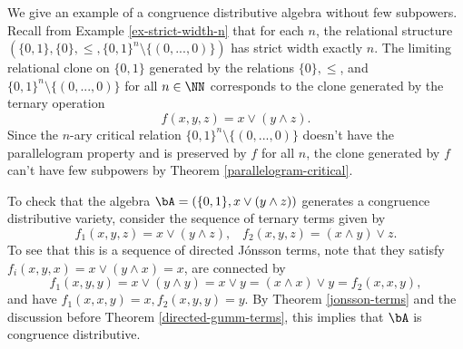 \begin{ex} We give an example of a congruence distributive algebra without few subpowers. Recall from Example \ref{ex-strict-width-n} that for each $n$, the relational structure $(\{0,1\}, \{0\}, \le, \{0,1\}^n\setminus\{(0,...,0)\})$ has strict width exactly $n$. The limiting relational clone on $\{0,1\}$ generated by the relations $\{0\}, \le$, and $\{0,1\}^n\setminus\{(0,...,0)\}$ for all $n \in \NN$ corresponds to the clone generated by the ternary operation
\[
f(x,y,z) = x \vee (y \wedge z).
\]
Since the $n$-ary critical relation $\{0,1\}^n\setminus\{(0,...,0)\}$ doesn't have the parallelogram property and is preserved by $f$ for all $n$, the clone generated by $f$ can't have few subpowers by Theorem \ref{parallelogram-critical}.

To check that the algebra $\bA = (\{0,1\}, x \vee (y \wedge z))$ generates a congruence distributive variety, consider the sequence of ternary terms given by
\[
f_1(x,y,z) = x\vee (y\wedge z), \;\;\; f_2(x,y,z) = (x\wedge y) \vee z.
\]
To see that this is a sequence of directed J\'onsson terms, note that they satisfy $f_i(x,y,x) = x \vee (y \wedge x) = x$, are connected by
\[
f_1(x,y,y) = x \vee (y \wedge y) = x \vee y = (x \wedge x) \vee y = f_2(x,x,y),
\]
and have $f_1(x,x,y) = x, f_2(x,y,y) = y$. By Theorem \ref{jonsson-terms} and the discussion before Theorem \ref{directed-gumm-terms}, this implies that $\bA$ is congruence distributive.
\end{ex}


